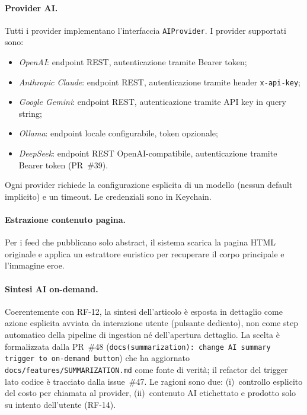 \paragraph{Provider AI.} Tutti i provider implementano l'interfaccia
\texttt{AIProvider}. I provider supportati sono:
\begin{itemize}
  \item \emph{OpenAI}: endpoint REST, autenticazione tramite Bearer token;
  \item \emph{Anthropic Claude}: endpoint REST, autenticazione tramite header
        \texttt{x-api-key};
  \item \emph{Google Gemini}: endpoint REST, autenticazione tramite API key in
        query string;
  \item \emph{Ollama}: endpoint locale configurabile, token opzionale;
  \item \emph{DeepSeek}: endpoint REST OpenAI-compatibile, autenticazione tramite
        Bearer token (PR~\#39).
\end{itemize}
Ogni provider richiede la configurazione esplicita di un modello (nessun
default implicito) e un timeout. Le credenziali sono in Keychain.

\paragraph{Estrazione contenuto pagina.} Per i feed che pubblicano solo
abstract, il sistema scarica la pagina HTML originale e applica un estrattore
euristico per recuperare il corpo principale e l'immagine eroe.

\paragraph{Sintesi AI on-demand.} Coerentemente con RF-12, la sintesi
dell'articolo è esposta in dettaglio come azione esplicita avviata da
interazione utente (pulsante dedicato), non come step automatico della
pipeline di ingestion né dell'apertura dettaglio. La scelta è formalizzata
dalla PR~\#48 (\texttt{docs(summarization): change AI summary trigger to
on-demand button}) che ha aggiornato \texttt{docs/features/SUMMARIZATION.md}
come fonte di verità; il refactor del trigger lato codice è tracciato dalla
issue~\#47. Le ragioni sono due: (i)~controllo esplicito del costo per
chiamata al provider, (ii)~contenuto AI etichettato e prodotto solo su
intento dell'utente (RF-14).

